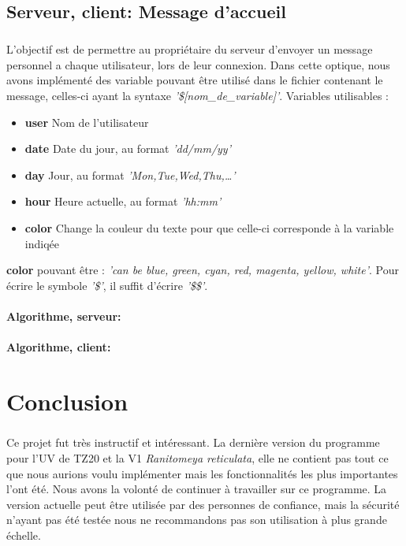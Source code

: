 \documentclass[12pt,a4paper,twoside]{article}
\begin{document}
		\subsection{Serveur, client: Message d'accueil} %
			\subparagraph*{}
				L'objectif est de permettre au propriétaire du serveur d'envoyer un message personnel a chaque utilisateur, lors de leur connexion.
				Dans cette optique, nous avons implémenté des variable pouvant être utilisé dans le fichier contenant le message, celles-ci ayant la syntaxe \textit{'\$[nom\_de\_variable]'}.
				Variables utilisables :
				\begin{itemize}
					\item{} \textbf{user} Nom de l'utilisateur
					\item{} \textbf{date} Date du jour, au format \textit{'dd/mm/yy'}
					\item{} \textbf{day} Jour, au format \textit{'Mon,Tue,Wed,Thu,\ldots'}
					\item{} \textbf{hour} Heure actuelle, au format \textit{'hh:mm'}
					\item{} \textbf{color} Change la couleur du texte pour que celle-ci corresponde à la variable indiqée
				\end{itemize}
				\textbf{color} pouvant être : \textit{'can be blue, green, cyan, red, magenta, yellow, white'}.
				Pour écrire le symbole \textit{'\$'}, il suffit d'écrire \textit{'\$\$'}.
			\paragraph*{Algorithme, serveur:}
				
				
			\paragraph*{Algorithme, client:}
				
				
	\section{Conclusion} %
		\subparagraph*{}
		Ce projet fut très instructif et intéressant. La dernière version du programme pour l'UV de TZ20 et la V1 \textit{Ranitomeya reticulata}, elle ne contient pas tout ce que nous aurions voulu implémenter mais les fonctionnalités les plus importantes l'ont été. Nous avons la volonté de continuer à travailler sur ce programme. La version actuelle peut être utilisée par des personnes de confiance, mais la sécurité n’ayant pas été testée nous ne recommandons pas son utilisation à plus grande échelle.
\end{document}
